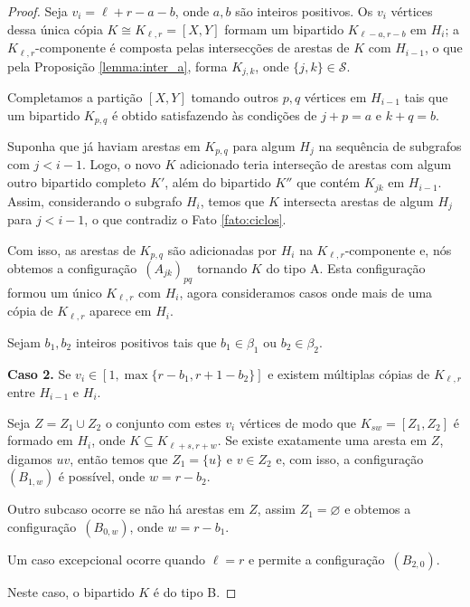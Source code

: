 \documentclass[12pt,a4paper]{book}
\newcommand{\K}{K_{\ell,r}} %
\let\subset\subseteq
\begin{document}
\begin{proof}
    Seja $v_i= \ell+r-a-b$, onde $a,b$ são inteiros positivos.  
    Os $v_i$ vértices dessa única cópia $K \cong \K= [X,Y]$ formam um bipartido $K_{\ell-a,r-b}$ em $H_i$; a $\K$-componente é composta pelas intersecções de arestas de $K$ com $H_{i-1}$, 
    o que pela Proposição \ref{lemma:inter_a},  forma $K_{j,k}$,
    onde $\{j,k\} \in \mathcal{S}$.  
   
   Completamos a partição $[X,Y]$ tomando outros $p,q$ vértices em $H_{i-1}$ tais que um bipartido $K_{p,q}$ é obtido satisfazendo às condições de  $j+p = a$ e $k+q = b$. 
   
   Suponha que já haviam arestas em $K_{p,q}$  para algum $H_j$ na sequência de subgrafos com $j < i-1$.
   Logo, o novo $K$ adicionado teria interseção de arestas com algum outro bipartido completo $K'$, além do bipartido $K''$ que contém $K_{jk}$ em $H_{i-1}$.
   Assim, considerando o subgrafo $H_{i}$,
   temos que $K$ 
   intersecta arestas de algum $H_j$ para $j<i-1$, o que contradiz o Fato \ref{fato:ciclos}.
  
     Com isso, as arestas de $K_{p,q}$ são adicionadas por $H_i$ na $\K$-componente e, nós obtemos a configuração~\hyperref[configA]{$(A_{jk})_{pq}$} tornando $K$ do tipo A.  
    Esta configuração formou um único $\K$ com $H_i$,  agora consideramos casos onde mais de uma cópia de $\K$ aparece em $H_i$.

    Sejam $b_1, b_2$ inteiros positivos tais que $b_1 \in \beta_1$ ou $b_2 \in \beta_2$.
    
     \medskip \textbf{Caso 2.} 
    Se $v_i \in [1, \max\{r - b_1, r+1-b_2\}]$ e existem múltiplas cópias de $\K$ entre $H_{i-1}$ e $H_i$.

 
   Seja $Z=Z_1\cup Z_2$ o conjunto com estes $v_i$ vértices de modo que 
   $K_{sw}=[Z_1,Z_2]$ é formado em $H_i$, onde $K \subset K_{\ell+s, r+w}$. 
   Se existe exatamente uma aresta em $Z$, digamos $uv$, então temos que
    $Z_1 = \{u\}$ e $v \in Z_2$ e, com isso, a configuração
    ~\hyperref[configB]{$(B_{1,w})$} é possível, onde $w = r-b_2$.
        
        Outro subcaso ocorre se não há arestas em $Z$, assim $Z_1 =
    \varnothing$ e obtemos a configuração~\hyperref[configB]{$(B_{0,w})$}, 
    onde $w = r-b_1$.
    
    Um caso excepcional ocorre quando $\ell = r$ e permite a
configuração~\hyperref[configB]{$(B_{2,0})$}. 
    
    Neste caso, o bipartido $K$ é do tipo B.
   

\end{proof}
\end{document}
